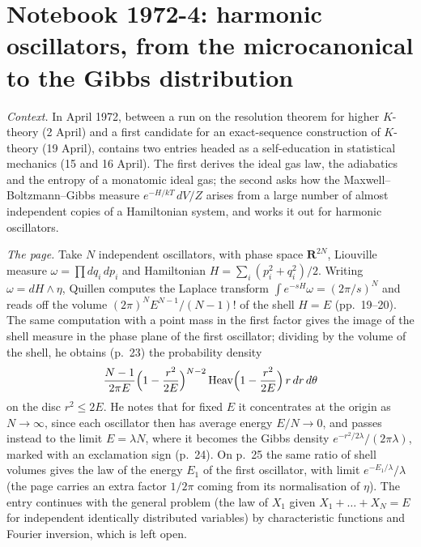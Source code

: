 \section[Notebook 1972-4: from the microcanonical to the Gibbs distribution]{Notebook 1972-4: harmonic oscillators, from the microcanonical to the Gibbs distribution\protect{}}\label{sec:quillen-1972-4}

\emph{Context.} In April 1972, between a run on the resolution theorem for higher $K$-theory (2 April) and a first candidate for an exact-sequence construction of $K$-theory (19 April),  contains two entries headed as a self-education in statistical mechanics (15 and 16 April). The first derives the ideal gas law, the adiabatics and the entropy of a monatomic ideal gas; the second asks how the Maxwell--Boltzmann--Gibbs measure $e^{-H/kT}\,dV/Z$ arises from a large number of almost independent copies of a Hamiltonian system, and works it out for harmonic oscillators.

\emph{The page.} Take $N$ independent oscillators, with phase space $\mathbf R^{2N}$, Liouville measure $\omega = \prod dq_i\,dp_i$ and Hamiltonian $H = \sum_i (p_i^2 + q_i^2)/2$. Writing $\omega = dH \wedge \eta$, Quillen computes the Laplace transform $\int e^{-sH}\omega = (2\pi/s)^N$ and reads off the volume $(2\pi)^N E^{N-1}/(N-1)!$ of the shell $H = E$ (pp.~19--20). The same computation with a point mass in the first factor gives the image of the shell measure in the phase plane of the first oscillator; dividing by the volume of the shell, he obtains (p.~23) the probability density
\[
\frac{N-1}{2\pi E}\Bigl(1 - \frac{r^2}{2E}\Bigr)^{N-2}\,\mathrm{Heav}\Bigl(1 - \frac{r^2}{2E}\Bigr)\, r\,dr\,d\theta
\]
on the disc $r^2 \le 2E$. He notes that for fixed $E$ it concentrates at the origin as $N \to \infty$, since each oscillator then has average energy $E/N \to 0$, and passes instead to the limit $E = \lambda N$, where it becomes the Gibbs density $e^{-r^2/2\lambda}/(2\pi\lambda)$, marked with an exclamation sign (p.~24). On p.~25 the same ratio of shell volumes gives the law of the energy $E_1$ of the first oscillator, with limit $e^{-E_1/\lambda}/\lambda$ (the page carries an extra factor $1/2\pi$ coming from its normalisation of $\eta$). The entry continues with the general problem (the law of $X_1$ given $X_1 + \dots + X_N = E$ for independent identically distributed variables) by characteristic functions and Fourier inversion, which is left open.

